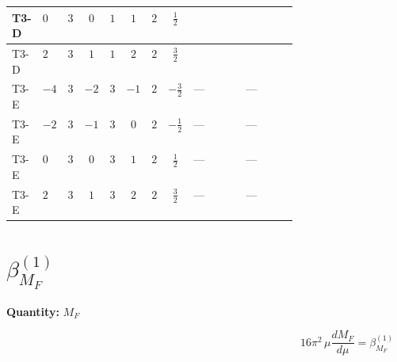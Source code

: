 \documentclass[8pt]{article}
\begin{document}
\begin{landscape}
\begin{longtable}{@{}llcccccc >{\raggedright\arraybackslash}p{0.21\linewidth} >{\raggedright\arraybackslash}p{0.21\linewidth}@{}}
\midrule
T3-D & $0$ & $3$ & $0$ & $1$ & $1$ & $2$ & $\frac{1}{2}$ & \scriptsize\adjustbox{max width=\linewidth}{$\begin{gathered} +\frac{1}{2} \left({Y_e}\,\left({Y_e}\right)^{\dagger}\,{y_2}\right)_{ij}\end{gathered}$} & \scriptsize\adjustbox{max width=\linewidth}{$\begin{gathered} +\left({y_2}\,\left({y_2}\right)^{\dagger}\,{y_2}\right)_{ij}\end{gathered}$} \\
\midrule
T3-D & $2$ & $3$ & $1$ & $1$ & $2$ & $2$ & $\frac{3}{2}$ & \scriptsize\adjustbox{max width=\linewidth}{$\begin{gathered} +\frac{1}{2} \left({Y_e}\,\left({Y_e}\right)^{\dagger}\,{y_2}\right)_{ij}\end{gathered}$} & \scriptsize\adjustbox{max width=\linewidth}{$\begin{gathered} +\left({y_2}\,\left({y_2}\right)^{\dagger}\,{y_2}\right)_{ij}\end{gathered}$} \\
\midrule
T3-E & $-4$ & $3$ & $-2$ & $3$ & $-1$ & $2$ & $-\frac{3}{2}$ & --- & --- \\
\midrule
T3-E & $-2$ & $3$ & $-1$ & $3$ & $0$ & $2$ & $-\frac{1}{2}$ & --- & --- \\
\midrule
T3-E & $0$ & $3$ & $0$ & $3$ & $1$ & $2$ & $\frac{1}{2}$ & --- & --- \\
\midrule
T3-E & $2$ & $3$ & $1$ & $3$ & $2$ & $2$ & $\frac{3}{2}$ & --- & --- \\
\midrule
\bottomrule
\end{longtable}
\clearpage
\section*{$\beta_{M_F}^{(1)}$}
\noindent\textbf{Quantity: }$M_F$\par\smallskip
\[16\pi^2\,\mu\frac{d M_F}{d\mu}=\beta_{M_F}^{(1)}\]

\end{landscape}
\end{document}
